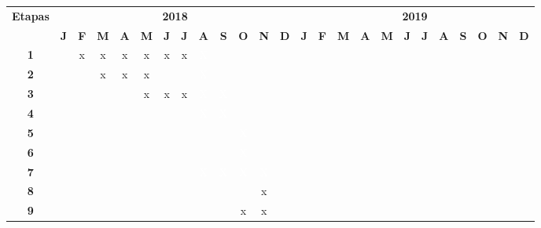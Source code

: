 \begin{center}

\vspace{0.5cm}
{\tiny
\noindent \begin{adjustbox}{max width=\textwidth}\begin{tabular}{|c||c|c|c|c|c|c|c|c|c|c|c|c||c|c|c|c|c|c|c|c|c|c|c|c|}
  \hline
  \multirow{2}{*}{\textbf{\small{Etapas}}} & \multicolumn{12}{|c||}{\textbf{\small{2018}}} & \multicolumn{12}{|c|}{\textbf{\small{2019}}} \\
  \cline{2-25}
   & \textbf{J} & \textbf{F} & \textbf{M} & \textbf{A} & \textbf{M} & \textbf{J} & \textbf{J} & \textbf{A} & \textbf{S} & \textbf{O} & \textbf{N} & \textbf{D} & \textbf{J} & \textbf{F} & \textbf{M} & \textbf{A} & \textbf{M} & \textbf{J} & \textbf{J} & \textbf{A} & \textbf{S} & \textbf{O} & \textbf{N} & \textbf{D} \\
  \hline \hline
  \textbf{\small{ 1}} &  & x & x & x & x & x & x & \cellcolor{black} \textcolor{white}{X} &  &  &  &  &  &  &  &  &  &  &  &  &  &  &  & \\ \hline
  \textbf{\small{ 2}} &  &  & x & x & x &  &  & \cellcolor{black} \textcolor{white}{X} &  &  &  &  &  &  &  &  &  &  &  &  &  &  &  & \\ \hline
  \textbf{\small{ 3}} &  &  &  &  & x & x & x & \cellcolor{black} \textcolor{white}{X} & \cellcolor{black} \textcolor{white}{X} &  &  &  &  &  &  &  &  &  &  &  &  &  &  & \\ \hline
  \textbf{\small{ 4}} &  &  &  &  &  &  &  & \cellcolor{black} \textcolor{white}{X} & \cellcolor{black} \textcolor{white}{X} &  &  &  &  &  &  &  &  &  &  &  &  &  &  & \\ \hline
  \textbf{\small{ 5}} &  &  &  &  &  &  &  &  &  & \cellcolor{black} \textcolor{white}{X} &  &  &  &  &  &  &  &  &  &  &  &  &  & \\ \hline
  \textbf{\small{ 6}} &  &  &  &  &  &  &  &  &  & \cellcolor{black} \textcolor{white}{X} &  &  &  &  &  &  &  &  &  &  &  &  &  & \\ \hline
  \textbf{\small{ 7}} &  &  &  &  &  &  &  & \cellcolor{black} \textcolor{white}{X} & \cellcolor{black} \textcolor{white}{X} & \cellcolor{black} \textcolor{white}{X} & \cellcolor{black} \textcolor{white}{X} &  &  &  &  &  &  &  &  &  &  &  &  & \\ \hline
  \textbf{\small{ 8}} &  &  &  &  &  &  &  &  &  &   & x & \cellcolor{black} & \cellcolor{black} &  &  &  &  &  &  &  &  &  &  & \\ \hline
  \textbf{\small{ 9}} &  &  &  &  &  &  &  &  &  & x & x & \cellcolor{black} & \cellcolor{black} &  &  &  &  &  &  &  &  &  &  & \\ \hline

\end{tabular}
\end{adjustbox}}
\end{center}
